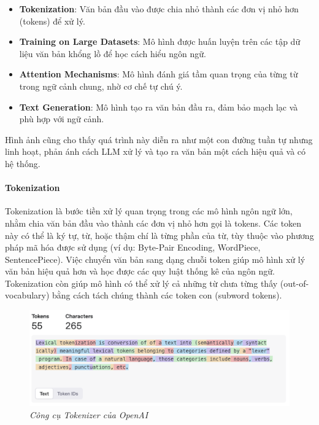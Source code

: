 \documentclass{article}
\begin{document}
\begin{itemize}[topsep=0pt, itemsep=0pt, leftmargin=40pt]
    \item \textbf{Tokenization}: Văn bản đầu vào được chia nhỏ thành các đơn vị nhỏ hơn (tokens) để xử lý.
    \item \textbf{Training on Large Datasets}: Mô hình được huấn luyện trên các tập dữ liệu văn bản khổng lồ để học cách hiểu ngôn ngữ.
    \item \textbf{Attention Mechanisms}: Mô hình đánh giá tầm quan trọng của từng từ trong ngữ cảnh chung, nhờ cơ chế tự chú ý.
    \item \textbf{Text Generation}: Mô hình tạo ra văn bản đầu ra, đảm bảo mạch lạc và phù hợp với ngữ cảnh.
\end{itemize}

Hình ảnh cũng cho thấy quá trình này diễn ra như một con đường tuần tự nhưng linh hoạt, phản ánh cách LLM xử lý và tạo ra văn bản một cách hiệu quả và có hệ thống.

\paragraph{Tokenization}

Tokenization là bước tiền xử lý quan trọng trong các mô hình ngôn ngữ lớn, nhằm chia văn bản đầu vào thành các đơn vị nhỏ hơn gọi là tokens. Các token này có thể là ký tự, từ, hoặc thậm chí là từng phần của từ, tùy thuộc vào phương pháp mã hóa được sử dụng (ví dụ: Byte-Pair Encoding, WordPiece, SentencePiece). Việc chuyển văn bản sang dạng chuỗi token giúp mô hình xử lý văn bản hiệu quả hơn và học được các quy luật thống kê của ngôn ngữ. Tokenization còn giúp mô hình có thể xử lý cả những từ chưa từng thấy (out-of-vocabulary) bằng cách tách chúng thành các token con (subword tokens).

\begin{figure}[H]
    \centering
    \includegraphics[width=1\linewidth]{img/llm-tokenizers.png}
    \caption{\textit{Công cụ Tokenizer của OpenAI}}
    \label{fig:2.1.2}
\end{figure}
\end{document}
